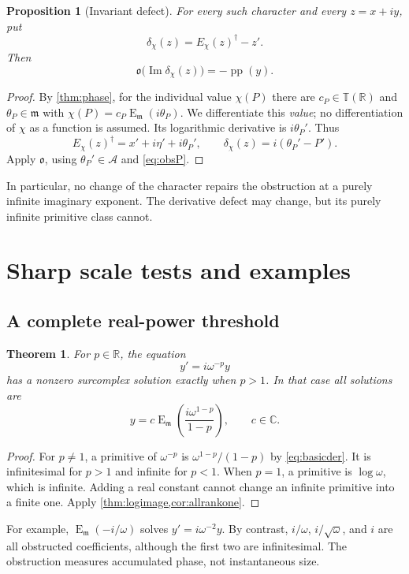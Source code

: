 \documentclass[11pt,letterpaper]{article}
\numberwithin{equation}{section}
\newtheorem{theorem}{Theorem}[section]
\newtheorem{proposition}[proposition]{Proposition}
\theoremstyle{definition}
\theoremstyle{remark}
\newcommand{\R}{\mathbb R}
\newcommand{\C}{\mathbb C}
\newcommand{\mm}{\mathfrak m}
\newcommand{\ARate}{\mathcal A}
\newcommand{\pp}{\operatorname{pp}}
\newcommand{\im}{\operatorname{Im}}
\newcommand{\Em}{\operatorname{E}_{\mm}}
\newcommand{\Obs}{\mathfrak o}
\newcommand{\ttt}{\mathbb T}
\begin{document}
\begin{proposition}[Invariant defect]\label{prop:defect}
For every such character and every $z=x+iy$, put
\[
 \delta_\chi(z)=E_\chi(z)^\dagger-z'.
\]
Then
\begin{equation}\label{eq:defect}
 \Obs\bigl(\im\delta_\chi(z)\bigr)=-\pp(y).
\end{equation}
\end{proposition}
\begin{proof}
By \cref{thm:phase}, for the individual value $\chi(P)$ there are $c_P\in\ttt(\R)$ and $\theta_P\in\mm$ with $\chi(P)=c_P\Em(i\theta_P)$. We differentiate this \emph{value}; no differentiation of $\chi$ as a function is assumed. Its logarithmic derivative is $i\theta_P'$. Thus
\[
 E_\chi(z)^\dagger=x'+i\eta'+i\theta_P',\qquad
 \delta_\chi(z)=i(\theta_P'-P').
\]
Apply $\Obs$, using $\theta_P'\in\ARate$ and \eqref{eq:obsP}.
\end{proof}

In particular, no change of the character repairs the obstruction at a purely infinite imaginary exponent. The derivative defect may change, but its purely infinite primitive class cannot.

\section{Sharp scale tests and examples}\label{sec:scales}

\subsection{A complete real-power threshold}
\begin{theorem}\label{thm:power}
For $p\in\R$, the equation
\[
 y'=i\omega^{-p}y
\]
has a nonzero surcomplex solution exactly when $p>1$. In that case all solutions are
\[
 y=c\Em\!\left(\frac{i\omega^{1-p}}{1-p}\right),\qquad c\in\C.
\]
\end{theorem}
\begin{proof}
For $p\ne1$, a primitive of $\omega^{-p}$ is $\omega^{1-p}/(1-p)$ by \eqref{eq:basicder}. It is infinitesimal for $p>1$ and infinite for $p<1$. When $p=1$, a primitive is $\log\omega$, which is infinite. Adding a real constant cannot change an infinite primitive into a finite one. Apply \cref{thm:logimage,cor:allrankone}.
\end{proof}

For example, $\Em(-i/\omega)$ solves $y'=i\omega^{-2}y$. By contrast, $i/\omega$, $i/\sqrt\omega$, and $i$ are all obstructed coefficients, although the first two are infinitesimal. The obstruction measures accumulated phase, not instantaneous size.
\end{document}
